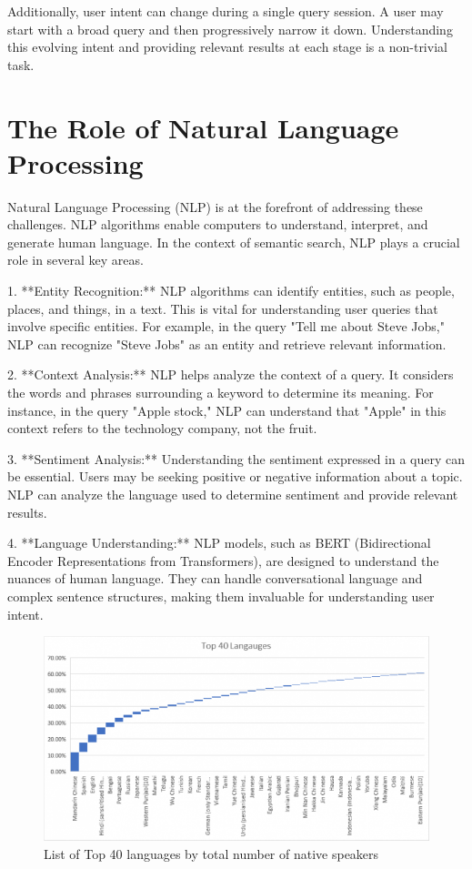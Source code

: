 \documentclass[10pt,oneside,a4paper]{article}
\begin{document}
Additionally, user intent can change during a single query session. A user may start with a broad query and then progressively narrow it down. Understanding this evolving intent and providing relevant results at each stage is a non-trivial task.


\section{The Role of Natural Language Processing}
Natural Language Processing (NLP) is at the forefront of addressing these challenges. NLP algorithms enable computers to understand, interpret, and generate human language. In the context of semantic search, NLP plays a crucial role in several key areas.

1. **Entity Recognition:** NLP algorithms can identify entities, such as people, places, and things, in a text. This is vital for understanding user queries that involve specific entities. For example, in the query "Tell me about Steve Jobs," NLP can recognize "Steve Jobs" as an entity and retrieve relevant information.

2. **Context Analysis:** NLP helps analyze the context of a query. It considers the words and phrases surrounding a keyword to determine its meaning. For instance, in the query "Apple stock," NLP can understand that "Apple" in this context refers to the technology company, not the fruit.

3. **Sentiment Analysis:** Understanding the sentiment expressed in a query can be essential. Users may be seeking positive or negative information about a topic. NLP can analyze the language used to determine sentiment and provide relevant results.

4. **Language Understanding:** NLP models, such as BERT (Bidirectional Encoder Representations from Transformers), are designed to understand the nuances of human language. They can handle conversational language and complex sentence structures, making them invaluable for understanding user intent.

\begin{figure}[ht]
    \centering
    \includegraphics[width=1\textwidth]{NLP.png}
    \caption{List of Top 40 languages by total number of native speakers}
\end{figure}
\end{document}
